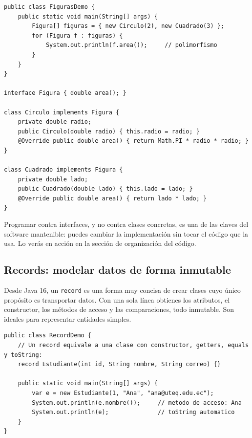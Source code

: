\documentclass[11pt]{article}
\begin{document}
\begin{cajacodigo}
\begin{lstlisting}[style=java]
public class FigurasDemo {
    public static void main(String[] args) {
        Figura[] figuras = { new Circulo(2), new Cuadrado(3) };
        for (Figura f : figuras) {
            System.out.println(f.area());     // polimorfismo
        }
    }
}

interface Figura { double area(); }

class Circulo implements Figura {
    private double radio;
    public Circulo(double radio) { this.radio = radio; }
    @Override public double area() { return Math.PI * radio * radio; }
}

class Cuadrado implements Figura {
    private double lado;
    public Cuadrado(double lado) { this.lado = lado; }
    @Override public double area() { return lado * lado; }
}
\end{lstlisting}
\end{cajacodigo}
\vspace{2pt}
Programar contra interfaces, y no contra clases concretas, es una de las claves del software mantenible: puedes cambiar la implementación sin tocar el código que la usa. Lo verás en acción en la sección de organización del código.

\subsection{Records: modelar datos de forma inmutable}
Desde Java 16, un \texttt{record} es una forma muy concisa de crear clases cuyo único propósito es transportar datos. Con una sola línea obtienes los atributos, el constructor, los métodos de acceso y las comparaciones, todo inmutable. Son ideales para representar entidades simples.

\begin{cajacodigo}
\begin{lstlisting}[style=java]
public class RecordDemo {
    // Un record equivale a una clase con constructor, getters, equals y toString:
    record Estudiante(int id, String nombre, String correo) {}

    public static void main(String[] args) {
        var e = new Estudiante(1, "Ana", "ana@uteq.edu.ec");
        System.out.println(e.nombre());     // metodo de acceso: Ana
        System.out.println(e);              // toString automatico
    }
}
\end{lstlisting}
\end{cajacodigo}
\vspace{2pt}
\end{document}

